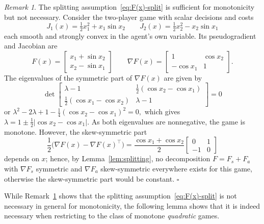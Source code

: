 \documentclass[11pt, a4paper]{article}
\newcommand{\QED}{\hfill\ensuremath{\square}}
\theoremstyle{remark}
\newtheorem{remark}[theorem]{Remark}
\theoremstyle{plain}
\begin{document}
\begin{remark}
\label{rmk:splitting_not_necessary}
The splitting assumption~\eqref{eq:F(x)-split} is sufficient for monotonicity but not
necessary. Consider the two-player game with scalar decisions and costs
\[
J_1(x)=\tfrac12x_1^2+x_1\sin x_2
\qquad
J_2(x)=\tfrac12x_2^2-x_2\sin x_1
\]
each smooth and strongly convex in the agent's own variable. Its
pseudogradient and Jacobian are
\[
F(x)=\begin{bmatrix}x_1+\sin x_2\\ x_2-\sin x_1\end{bmatrix}
\qquad
\nabla F(x)=\begin{bmatrix}1 & \cos x_2\\ -\cos x_1 & 1\end{bmatrix}.
\]
The eigenvalues of the symmetric part of $\nabla F(x)$ are given by
\[
    \det\begin{bmatrix}
         \lambda - 1 & \frac12(\cos x_2-\cos x_1) \\ \frac12(\cos x_1-\cos x_2) & \lambda - 1 
    \end{bmatrix} = 0
\]
or
$
    \lambda^2 - 2\lambda + 1 - \frac14(\cos x_2-\cos x_1)^2 = 0,
$
which gives $\lambda = 1 \pm \frac12|\cos x_2-\cos x_1|$. As both
eigenvalues are nonnegative, the game is monotone.
However, the skew-symmetric part
\[
\frac12\bigl(\nabla F(x)-\nabla F(x)^\top\bigr)
=\frac{\cos x_1+\cos x_2}{2}
\begin{bmatrix}0&1\\-1&0\end{bmatrix}
\]
depends on $x$; hence, by Lemma~\ref{lem:splitting}, no decomposition $F=F_s+F_a$ with
$\nabla F_s$ symmetric and $\nabla F_a$ skew-symmetric everywhere exists
for this game, otherwise the skew-symmetric part would be constant.
\QED
\end{remark}
While Remark~\ref{rmk:splitting_not_necessary} shows that the splitting assumption~\eqref{eq:F(x)-split} is not necessary in general for monotonicity, the following lemma
shows that it is indeed necessary when restricting to the class of monotone {\it quadratic} games. 
\end{document}
